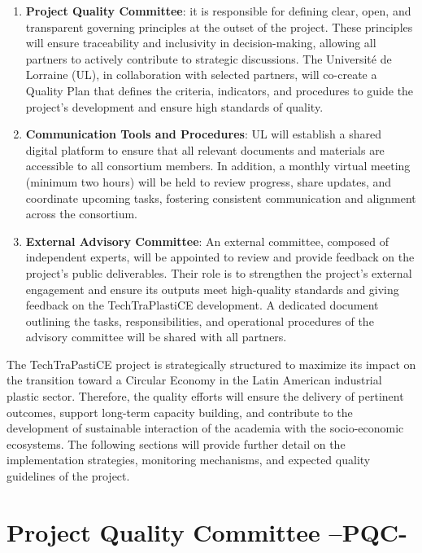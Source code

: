 \documentclass[
  12pt,
  oneside]{book}
\begin{document}
\begin{enumerate}
\def\labelenumi{\arabic{enumi}.}
\item
  \textbf{Project Quality Committee}: it is responsible for defining
  clear, open, and transparent governing principles at the outset of the
  project. These principles will ensure traceability and inclusivity in
  decision-making, allowing all partners to actively contribute to
  strategic discussions. The Université de Lorraine (UL), in
  collaboration with selected partners, will co-create a Quality Plan
  that defines the criteria, indicators, and procedures to guide the
  project's development and ensure high standards of quality.
\item
  \textbf{Communication Tools and Procedures}: UL will establish a
  shared digital platform to ensure that all relevant documents and
  materials are accessible to all consortium members. In addition, a
  monthly virtual meeting (minimum two hours) will be held to review
  progress, share updates, and coordinate upcoming tasks, fostering
  consistent communication and alignment across the consortium.
\item
  \textbf{External Advisory Committee}: An external committee, composed
  of independent experts, will be appointed to review and provide
  feedback on the project's public deliverables. Their role is to
  strengthen the project's external engagement and ensure its outputs
  meet high-quality standards and giving feedback on the TechTraPlastiCE
  development. A dedicated document outlining the tasks,
  responsibilities, and operational procedures of the advisory committee
  will be shared with all partners.
\end{enumerate}

The TechTraPastiCE project is strategically structured to maximize its
impact on the transition toward a Circular Economy in the Latin American
industrial plastic sector. Therefore, the quality efforts will ensure
the delivery of pertinent outcomes, support long-term capacity building,
and contribute to the development of sustainable interaction of the
academia with the socio-economic ecosystems. The following sections will
provide further detail on the implementation strategies, monitoring
mechanisms, and expected quality guidelines of the project.

\chapter{Project Quality Committee
--PQC-}\label{project-quality-committee-pqc-}
\end{document}
